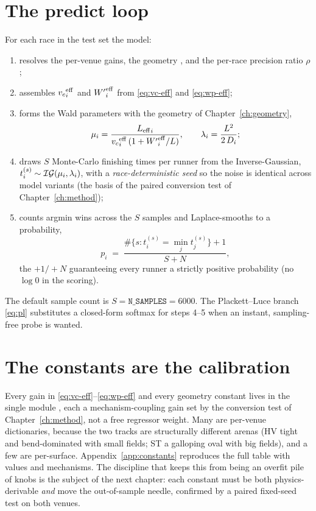 \section{The predict loop}

For each race in the test set the model:
\begin{enumerate}[label=\arabic*.]
  \item resolves the per-venue gains, the geometry , and
        the per-race precision ratio $\rho$;
  \item assembles ${v_{c}}^{\mathrm{eff}}_i$ and ${W^{\prime}}^{\mathrm{eff}}_i$ from \eqref{eq:vc-eff} and
        \eqref{eq:wp-eff};
  \item forms the Wald parameters with the geometry of Chapter~\ref{ch:geometry},
        \begin{equation}
          \mu_i = \frac{{L_{\mathrm{eff}}}_i}{{v_{c}}^{\mathrm{eff}}_i\,(1+{W^{\prime}}^{\mathrm{eff}}_i/L)},
          \qquad
          \lambda_i = \frac{L^2}{2\,D_i};
        \end{equation}
  \item draws $S$ Monte-Carlo finishing times per runner from the Inverse-Gaussian,
        $t^{(s)}_i \sim \mathcal{IG}(\mu_i,\lambda_i)$, with a \emph{race-deterministic seed} so the noise
        is identical across model variants (the basis of the paired conversion test of
        Chapter~\ref{ch:method});
  \item counts argmin wins across the $S$ samples and Laplace-smooths to a probability,
        \begin{equation}
          p_i \;=\; \frac{\#\{s: t^{(s)}_i = \min_j t^{(s)}_j\} + 1}{S + N},
          \label{eq:laplace}
        \end{equation}
        the $+1/+N$ guaranteeing every runner a strictly positive probability (no $\log 0$ in the
        scoring).
\end{enumerate}
The default sample count is $S=\texttt{N\_SAMPLES}=6000$. The Plackett--Luce branch
\eqref{eq:pl} substitutes a closed-form softmax for steps 4--5 when an instant, sampling-free probe
is wanted.

\section{The constants are the calibration}

Every gain in \eqref{eq:vc-eff}--\eqref{eq:wp-eff} and every geometry constant lives in the single
module , each a mechanism-coupling gain set by the conversion test of
Chapter~\ref{ch:method}, not a free regressor weight. Many are per-venue dictionaries, because the
two tracks are structurally different arenas (HV tight and bend-dominated with small fields; ST a
galloping oval with big fields), and a few are per-surface. Appendix~\ref{app:constants} reproduces
the full table with values and mechanisms. The discipline that keeps this from being an
overfit pile of knobs is the subject of the next chapter: each constant must be both
physics-derivable \emph{and} move the out-of-sample needle, confirmed by a paired fixed-seed test
on both venues.
